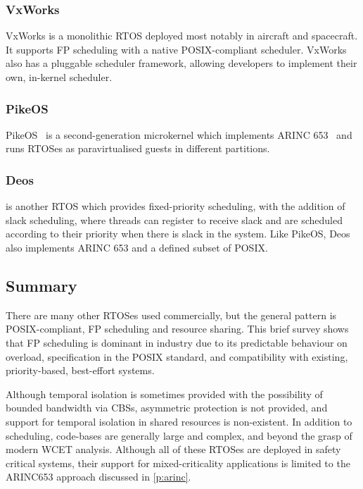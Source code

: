\subsubsection{VxWorks}

VxWorks\citep{VxWorks_08} is a monolithic \gls{RTOS} deployed most notably in aircraft
and spacecraft.  It supports \gls{FP} scheduling with a native POSIX-compliant scheduler.  VxWorks
also has a pluggable scheduler framework, allowing developers to implement their own, in-kernel
scheduler.

\subsubsection{PikeOS}

PikeOS~\citep{PikeOS:URL} is a second-generation microkernel which implements ARINC 653~\citep{ARINC653} 
and runs RTOSes as paravirtualised guests in different partitions. 

\subsubsection{Deos}

\citet{Deos} is another RTOS which provides fixed-priority scheduling, with the addition of slack
scheduling, where threads can register to receive slack and are scheduled according to their
priority when there is slack in the system. Like PikeOS, Deos also implements ARINC 653 and a
defined subset of POSIX.

\subsection{Summary}

There are many other \gls{RTOS}es used commercially, but the general pattern is POSIX-compliant, 
\gls{FP} scheduling and resource sharing.
This brief survey shows that \gls{FP} scheduling is dominant in industry due to its predictable
behaviour on overload, specification in the
POSIX standard, and compatibility with existing, priority-based, best-effort systems.

Although temporal isolation is sometimes provided with the possibility of bounded bandwidth via
\glspl{CBS}, asymmetric protection is not provided, and support for temporal isolation in 
shared resources is non-existent. In addition to scheduling, code-bases are
generally large and complex, and beyond the grasp of modern {\gls{WCET}} analysis.  Although all of
these \gls{RTOS}es are deployed in safety critical systems, their support for mixed-criticality
applications is limited to the ARINC653 approach discussed in \cref{p:arinc}. 

